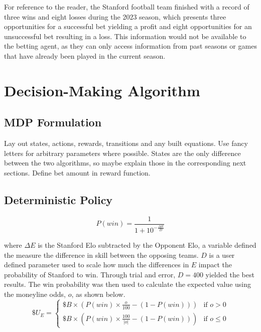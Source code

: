 \documentclass[conf]{new-aiaa}
\begin{document}
For reference to the reader, the Stanford football team finished with a record of three wins and eight losses during the 2023 season, which presents three opportunities for a successful bet yielding a profit and eight opportunities for an unsuccessful bet resulting in a loss. This information would not be available to the betting agent, as they can only access information from past seasons or games that have already been played in the current season. 


\section{Decision-Making Algorithm}



\subsection{MDP Formulation}
Lay out states, actions, rewards, transitions and any built equations. Use fancy letters for arbitrary parameters where possible. States are the only difference between the two algorithms, so maybe explain those in the corresponding next sections. Define bet amount in reward function.

\subsection{Deterministic Policy}

\begin{equation}
\label{win prob}
P(win) = \frac{1}{1 + 10^{-\frac{\Delta E}{D}}}
\end{equation}

where $\Delta E$ is the Stanford Elo subtracted by the Opponent Elo, a variable defined the measure the difference in skill between the opposing teams. $D$ is a user defined parameter used to scale how much the differences in $E$ impact the probability of Stanford to win. Through trial and error, $D=400$ yielded the best results. The win probability was then used to calculate the expected value using the moneyline odds, $o$, as shown below. 
\begin{equation}
\$U_E = 
\begin{cases} 
\$B \times \left( P(win) \times \frac{o}{100} - (1 - P(win)) \right) & \text{if } o > 0 \\
\$B \times \left( P(win) \times \frac{100}{|o|} - (1 - P(win)) \right) & \text{if } o \leq 0
\end{cases}
\end{equation}
\end{document}
